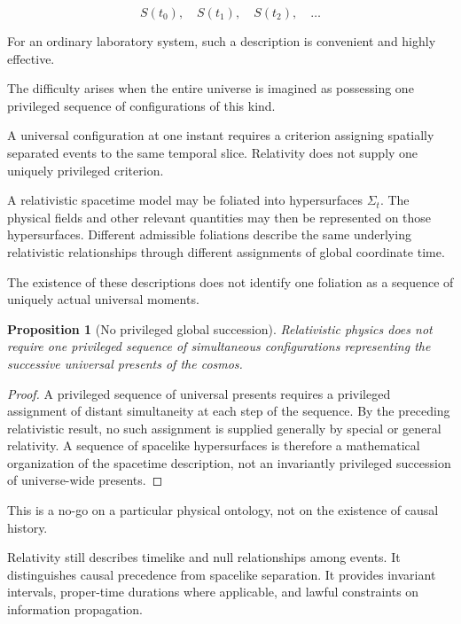 \documentclass[12pt,onecolumn]{article}
\newtheorem{proposition}{Proposition}[section]
\begin{document}
\begin{equation}
S(t_0),\quad S(t_1),\quad S(t_2),\quad \ldots
\end{equation}

For an ordinary laboratory system, such a description is convenient and highly effective.

The difficulty arises when the entire universe is imagined as possessing one privileged sequence of configurations of this kind.

A universal configuration at one instant requires a criterion assigning spatially separated events to the same temporal slice. Relativity does not supply one uniquely privileged criterion.

A relativistic spacetime model may be foliated into hypersurfaces \(\Sigma_t\). The physical fields and other relevant quantities may then be represented on those hypersurfaces. Different admissible foliations describe the same underlying relativistic relationships through different assignments of global coordinate time.

The existence of these descriptions does not identify one foliation as a sequence of uniquely actual universal moments.

\begin{proposition}[No privileged global succession]

Relativistic physics does not require one privileged sequence of simultaneous configurations representing the successive universal presents of the cosmos.

\end{proposition}

\begin{proof}

A privileged sequence of universal presents requires a privileged assignment of distant simultaneity at each step of the sequence. By the preceding relativistic result, no such assignment is supplied generally by special or general relativity. A sequence of spacelike hypersurfaces is therefore a mathematical organization of the spacetime description, not an invariantly privileged succession of universe-wide presents.

\end{proof}

This is a no-go on a particular physical ontology, not on the existence of causal history.

Relativity still describes timelike and null relationships among events. It distinguishes causal precedence from spacelike separation. It provides invariant intervals, proper-time durations where applicable, and lawful constraints on information propagation.
\end{document}

